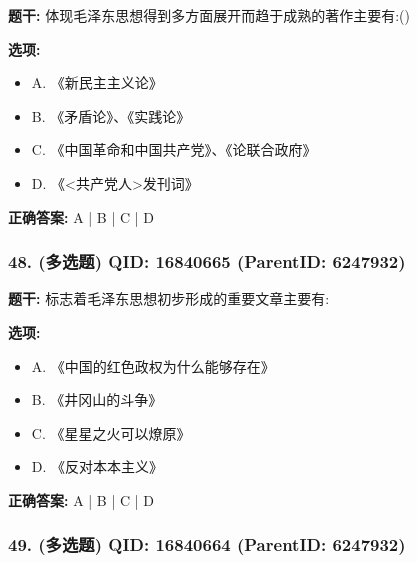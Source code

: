 \documentclass[12pt,UTF8]{ctexart}
\begin{document}
\textbf{题干:}
体现毛泽东思想得到多方面展开而趋于成熟的著作主要有:()



\textbf{选项:}
\begin{itemize}[leftmargin=*]

  \item A. 《新民主主义论》

  \item B. 《矛盾论》、《实践论》

  \item C. 《中国革命和中国共产党》、《论联合政府》

  \item D. 《<共产党人>发刊词》

\end{itemize}

\textbf{正确答案:}
A | B | C | D

\vspace{0.3em}\hrulefill\vspace{0.7em}

\subsubsection*{48. (多选题) \small QID: 16840665 (ParentID: 6247932)}

\textbf{题干:}
标志着毛泽东思想初步形成的重要文章主要有:



\textbf{选项:}
\begin{itemize}[leftmargin=*]

  \item A. 《中国的红色政权为什么能够存在》

  \item B. 《井冈山的斗争》

  \item C. 《星星之火可以燎原》

  \item D. 《反对本本主义》

\end{itemize}

\textbf{正确答案:}
A | B | C | D

\vspace{0.3em}\hrulefill\vspace{0.7em}

\subsubsection*{49. (多选题) \small QID: 16840664 (ParentID: 6247932)}
\end{document}
